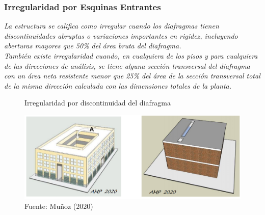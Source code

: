 \documentclass{article}%
\begin{document}
%
\subsubsection{Irregularidad por Esquinas Entrantes}%
\label{ssubsec:IrregularidadporEsquinasEntrantes}%
\begin{tcolorbox}[colback=gray!5!white,colframe=cyan!75!black,fonttitle=\bfseries,title=Tabla N°9 E-030]%
\textit{La estructura se califica como irregular cuando los diafragmas tienen discontinuidades abruptas o variaciones importantes en rigidez, incluyendo aberturas mayores que 50\% del área bruta del diafragma.} \\ \textit{También  existe  irregularidad  cuando,  en  cualquiera de  los pisos y para cualquiera de las direcciones de análisis, se tiene alguna sección transversal del diafragma con un área neta resistente menor que 25\% del área de la sección transversal total de la misma dirección calculada con las dimensiones totales de la planta.}%
\end{tcolorbox}%


\begin{figure}[ht!]%
\centering%
\caption{Irregularidad por discontinuidad del diafragma}%
\includegraphics[scale=0.7]{i_diafragma.PNG}%
\caption*{\small Fuente: Muñoz (2020)}%
\end{figure}

%
\end{document}
